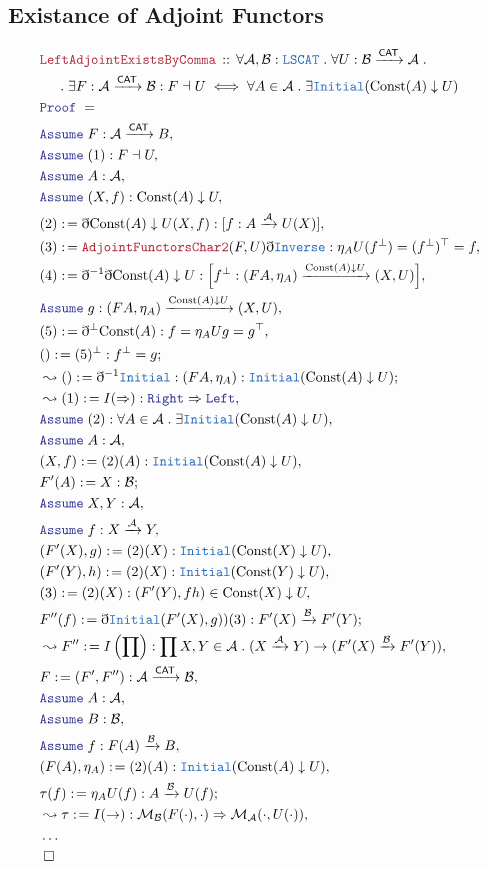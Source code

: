 \documentclass[12pt]{scrartcl}
\newcommand{\TYPE}[1]{\textcolor{NavyBlue}{\mathtt{#1}}}
\newcommand{\LOGIC}[1]{\textcolor{Blue}{\mathtt{#1}}}
\newcommand{\THM}[1]{\textcolor{Maroon}{\mathtt{#1}}}
\renewcommand{\.}{\; . \;}
\newcommand{\de}{: \kern 0.1pc =}
\newcommand{\Theorem}[2]{& \THM{#1} \, :: \, #2 \\ & \Proof = \\ }
\newcommand{\NewLine}{\\ & \kern 1pc}
\newcommand{\Page}[1]{ \begin{align*} #1 \end{align*}   }
\newcommand{ \bd }{ \ByDef }
\newcommand{\NoProof}{ & \ldots \\ \EndProof}
\newcommand{\Mor}{\mathcal{M}}
\newcommand{\Arrow}{\xrightarrow}
\newcommand{\Say}[3]{& #1 \de #2 : #3, \\}
\newcommand{\Conclude}[3]{& #1 \de #2 : #3; \\}
\newcommand{\Derive}[3]{& \leadsto #1 \de #2 : #3, \\}
\newcommand{\DeriveConclude}[3]{& \leadsto #1 \de #2 : #3 ; \\}
\newcommand{\Assume}[2]{& \LOGIC{Assume} \; #1 : #2, \\}
\newcommand{\QED}{\; \square}
\newcommand{\EndProof}{& \QED \\}
\newcommand{\ByDef}{\eth}
\newcommand{\Proof}{\LOGIC{Proof} \; }
\newcommand{\A}{\mathcal{A}}
\newcommand{\B}{\mathcal{B}}
\newcommand{\CAT}{\mathsf{CAT}}
\begin{document}
\subsection{Existance of Adjoint Functors}
\Page{
	\Theorem{LeftAdjointExistsByComma}{  
		\forall \A,\B : \TYPE{LSCAT} \. 
		\forall U : \B \Arrow{\CAT} \A \.  \NewLine \. 
			\exists F : \A \Arrow{\CAT} \B :
			F \dashv U
		\iff
			\forall A \in \A \.
			 \exists  \TYPE{Initial}(\mathrm{Const}(A) \downarrow U )
	}
	\Assume{F}{\A \Arrow{\CAT} B}
	\Assume{(1)}{F \dashv U}
	\Assume{A}{\A}
	\Assume{(X,f)}{\mathrm{Const}(A) \downarrow U}
	\Say{(2)}{ \bd \mathrm{Const}(A) \downarrow U (X,f)}{ [ f : A \Arrow{\A} U(X)  ]   }
	\Say{(3)}{ \THM{AdjointFunctorsChar2}(F,U) \bd \TYPE{Inverse} }{   \eta_A U(f^\bot) = (f^\bot)^\top = f }
	\Say{(4)}{\bd^{-1} \bd \mathrm{Const}(A) \downarrow U}
	{ \Big[ f^\bot : (FA,\eta_A) \Arrow{\mathrm{Const}(A) \downarrow U  } (X,U)  \Big]  }
	\Assume{g}{  (FA, \eta_A) \Arrow{\mathrm{Const}(A) \downarrow U} (X,U) }
	\Say{ (5)   }{  \bd^\bot \mathrm{Const}(A)   }{  
		f = \eta_A Ug = g^\top	
	}
	\Conclude{()}{  (5)^\bot   }{ f^\bot = g }
	\DeriveConclude{ () }{ \bd^{-1} \TYPE{Initial} }{ (FA,\eta_A) : \TYPE{Initial}(\mathrm{Const}(A) \downarrow U )}
	\Derive{(1)}{I(\Rightarrow)}{ \LOGIC{Right} \Rightarrow \LOGIC{Left}}
	\Assume{(2)}{\forall A \in \A \. \exists  \TYPE{Initial}(\mathrm{Const}(A) \downarrow U) }
	\Assume{A}{ \A }
	\Say{(X,f)}{(2)(A)}{\TYPE{Initial}(\mathrm{Const}(A) \downarrow U)}
	\Conclude{F'(A)}{ X }{\B}
	\Assume{X,Y}{\A}
	\Assume{f}{X \Arrow{\A} Y}
	\Say{(F'(X),g)}{(2)(X)}{\TYPE{Initial}(\mathrm{Const}(X) \downarrow U)}
	\Say{(F'(Y),h)}{(2)(X)}{\TYPE{Initial}(\mathrm{Const}(Y) \downarrow U)}
	\Say{ (3) }{  (2)(X)    }{ (F'(Y),fh) \in  \mathrm{Const}(X) \downarrow U  }
	\Conclude{  F''(f) }{  \bd \TYPE{Initial}(F'(X),g))(3) }{  F'(X) \Arrow{\B} F'(Y) }
	\Derive{F''}{I\left( \prod \right)}{\prod X,Y \in \A \. (X \Arrow{\A} Y) \to (F'(X) \Arrow{\B} F'(Y))}
	\Say{F}{(F',F'')}{  \A \Arrow{\CAT} \B }
	\Assume{A}{\A}
	\Assume{B}{\B}
	\Assume{f}{ F(A) \Arrow{\B} B}
	\Say{(F(A),\eta_A)}{(2)(A)}{\TYPE{Initial}(\mathrm{Const}(A) \downarrow U)} 
	\Conclude{\tau(f)}{  \eta_A U(f)}{A \Arrow{\B} U(f)}
	\Derive{\tau}{I(\to)}{ \Mor_\B(F(\cdot),\cdot) \Rightarrow  \Mor_\A(\cdot, U(\cdot))  }
	\NoProof
}
\newpage
\end{document}
